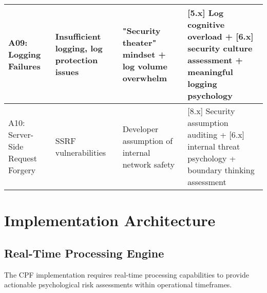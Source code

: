 \documentclass[10pt,twocolumn]{IEEEtran}
\begin{document}
\begin{table*}[t]
\begin{tabular}{@{}p{3cm}p{3.5cm}p{4cm}p{4.5cm}@{}}
\midrule
A09: Logging Failures & Insufficient logging, log protection issues & "Security theater" mindset + log volume overwhelm & [5.x] Log cognitive overload + [6.x] security culture assessment + meaningful logging psychology \\
\midrule
A10: Server-Side Request Forgery & SSRF vulnerabilities & Developer assumption of internal network safety & [8.x] Security assumption auditing + [6.x] internal threat psychology + boundary thinking assessment \\
\bottomrule
\end{tabular}
\end{table*}

\section{Implementation Architecture}

\subsection{Real-Time Processing Engine}

The CPF implementation requires real-time processing capabilities to provide actionable psychological risk assessments within operational timeframes.
\end{document}
